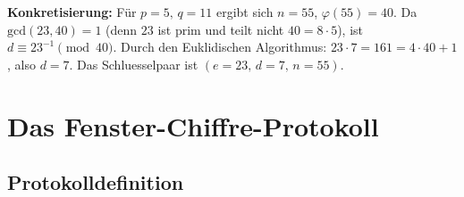﻿\documentclass[12pt, a4paper]{article}
\theoremstyle{plain}
\theoremstyle{definition}
\theoremstyle{remark}
\newcommand{\GCD}{\mathrm{gcd}}
\begin{document}
\textbf{Konkretisierung:} F\"ur $p=5,\, q=11$ ergibt sich $n=55$,
$\varphi(55)=40$. Da $\GCD(23,40)=1$ (denn $23$ ist prim und teilt nicht $40=8\cdot5$),
ist $d \equiv 23^{-1} \pmod{40}$. Durch den Euklidischen Algorithmus:
$23\cdot7 = 161 = 4\cdot40+1$, also $d=7$. Das Schluesselpaar ist $(e=23,\,d=7,\,n=55)$.

\section{Das Fenster-Chiffre-Protokoll}
\label{sec:protokoll}

\subsection{Protokolldefinition}
\end{document}
